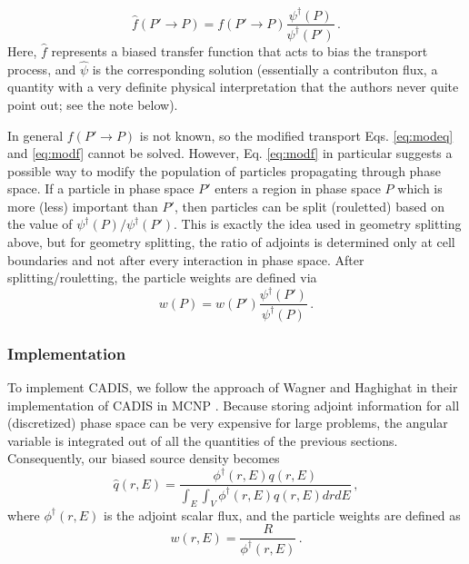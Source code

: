 \documentclass[letter,11pt]{article}
\begin{document}
\begin{equation}
 \hat{f}(P' \to P) = f(P' \to P) \frac{\psi^\dag(P) }{\psi^\dag(P') } \, .
 \label{eq:modf}
\end{equation}
Here, $\hat{f}$ represents a biased transfer function that acts to bias the transport process, and $\hat{\psi}$ is the corresponding solution (essentially a contributon flux, a quantity with a very definite physical interpretation that the authors never quite point out; see the note below).  

In general $f(P'\to P)$ is not known, so the modified transport Eqs. \ref{eq:modeq} and \ref{eq:modf} cannot be solved.  However, Eq. \ref{eq:modf} in particular suggests a possible way to modify the population of particles propagating through phase space.  If a particle in phase space $P'$ enters a region in phase space $P$ which is more (less) important than $P'$, then particles can be split (rouletted) based on the value of $\psi^\dag (P) / \psi^\dag (P')$.  This is exactly the idea used in geometry splitting above, but for geometry splitting, the ratio of adjoints is determined only at cell boundaries and not after every interaction in phase space.  After splitting/rouletting, the particle weights are defined via
\begin{equation}
 w(P) = w(P') \frac{\psi^\dag(P')}{\psi^\dag(P)} \, .
\end{equation}

\subsubsection{Implementation}
To implement CADIS, we follow the approach of Wagner and Haghighat in their implementation of CADIS in MCNP \cite{wagner1998avr}.  Because storing adjoint information for all (discretized) phase space can be very expensive for large problems, the angular variable is integrated out of all the quantities of the previous sections.  Consequently, our biased source density becomes
\begin{equation}
 \hat{q}(r,E) = \frac{\phi^\dag(r,E) q(r,E) }{ \int_E \int_V \phi^\dag(r,E) q(r,E) dr dE } \, ,
 \label{eq:biassrc2}
\end{equation}
where $\phi^\dag(r,E)$ is the adjoint scalar flux, and the particle weights are defined as
\begin{equation}
 w(r,E) = \frac{R}{\phi^\dag(r,E)} \, .
\end{equation}
\end{document}
